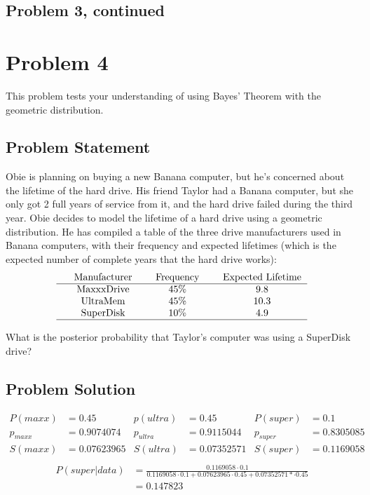 \documentclass[12pt]{article}
\theoremstyle{definition}
\begin{document}
\newpage
\subsection*{Problem 3, continued}





\newpage
\section*{Problem 4}

This problem tests your understanding of using Bayes' Theorem with the geometric distribution.


\subsection*{Problem Statement}

Obie is planning on buying a new Banana computer, but he's concerned about the lifetime of the hard drive. His friend Taylor had a Banana computer, but she only got 2 full years of service from it, and the hard drive failed during the third year. Obie decides to model the lifetime of a hard drive using a geometric distribution. He has compiled a table of the three drive manufacturers used in Banana computers, with their frequency and expected lifetimes (which is the expected number of complete years that the hard drive works):
$$
\begin{tabular}{ccccccc}
& Manufacturer & & Frequency & & Expected Lifetime\\
\hline
& MaxxxDrive & & 45\% & & 9.8\\
& UltraMem & & 45\% & & 10.3\\
& SuperDisk & & 10\% & & 4.9\\
\hline
\end{tabular}
$$

\bigskip
What is the posterior probability that Taylor's computer was using a SuperDisk drive?


\subsection*{Problem Solution}
\begin{align*}
P(maxx) &= 0.45 &p(ultra) &= 0.45 &P(super) &= 0.1\\
p_{maxx} &= 0.9074074 &p_{ultra} &= 0.9115044 &p_{super} &= 0.8305085\\
S(maxx) &= 0.07623965 &S(ultra) &= 0.07352571 &S(super) &= 0.1169058\\
\end{align*}
\begin{align*}
P(super|data) &= \frac{0.1169058 \cdot 0.1}{0.1169058 \cdot 0.1 + 0.07623965 \cdot 0.45 + 0.07352571 *\cdot 0.45}\\
&= 0.147823
\end{align*}
\end{document}
